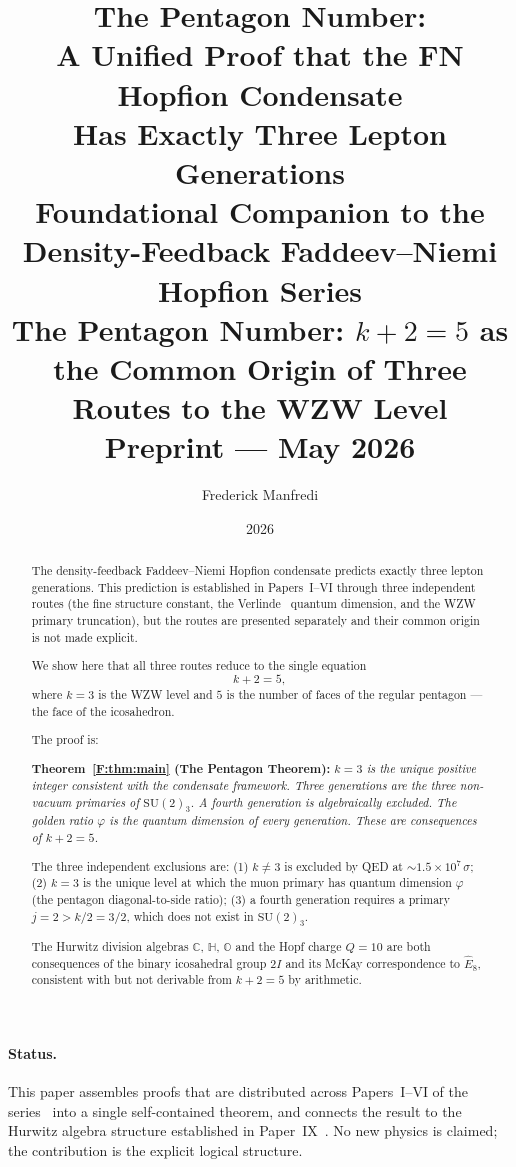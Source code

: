 \documentclass[11pt,a4paper]{article}
\title{\textbf{The Pentagon Number:\\
A Unified Proof that the FN Hopfion Condensate\\
Has Exactly Three Lepton Generations}
\\[0.6em]
{\large Foundational Companion to the Density-Feedback
Faddeev--Niemi Hopfion Series \\
The Pentagon Number: $k+2=5$ as the Common Origin
of Three Routes to the WZW Level}
\\[0.6em]
\large Preprint --- May 2026}
\author{Frederick Manfredi}
\date{2026}
\theoremstyle{definition}
\theoremstyle{remark}
\newcommand{\vp}{\varphi}
\newcommand{\CC}{\mathbb{C}}
\newcommand{\HH}{\mathbb{H}}
\newcommand{\OO}{\mathbb{O}}
\newcommand{\SUtwok}{\mathrm{SU}(2)_3}
\newcommand{\twoI}{2I}
\newcommand{\Ehat}{\hat{E}_8}
\begin{document}
\maketitle

\paragraph*{Status.}
This paper assembles proofs that are distributed across Papers~I--VI of the
series~\cite{Paper1,Paper2,Paper3,Paper4,Paper5,Paper6} into a single
self-contained theorem, and connects the result to the Hurwitz algebra
structure established in Paper~IX~\cite{Paper9}.
No new physics is claimed; the contribution is the explicit logical
structure.

\begin{abstract}
The density-feedback Faddeev--Niemi Hopfion condensate predicts exactly three
lepton generations.
This prediction is established in Papers~I--VI through three independent
routes (the fine structure constant, the Verlinde~\cite{Verlinde1988} quantum dimension, and the
WZW primary truncation), but the routes are presented separately and their
common origin is not made explicit.

We show here that all three routes reduce to the single equation
\begin{equation}
  k + 2 = 5,
  \label{F:eq:k_plus_2}
\end{equation}
where $k=3$ is the WZW level and $5$ is the number of faces of the regular
pentagon --- the face of the icosahedron.

The proof is:

\noindent\textbf{Theorem~\ref{F:thm:main} (The Pentagon Theorem):}
\textit{$k=3$ is the unique positive integer consistent with the condensate
framework.
Three generations are the three non-vacuum primaries of $\SUtwok$.
A fourth generation is algebraically excluded.
The golden ratio $\vp$ is the quantum dimension of every generation.
These are consequences of $k+2=5$.}

The three independent exclusions are:
(1) $k\neq3$ is excluded by QED at $\sim1.5\times10^7\,\sigma$;
(2) $k=3$ is the unique level at which the muon primary has quantum
    dimension $\vp$ (the pentagon diagonal-to-side ratio);
(3) a fourth generation requires a primary $j=2 > k/2 = 3/2$,
    which does not exist in $\SUtwok$.

The Hurwitz division algebras $\CC$, $\HH$, $\OO$ and the Hopf charge
$Q=10$ are both consequences of the binary icosahedral group $\twoI$ and
its McKay correspondence to $\Ehat$, consistent with but not derivable from
$k+2=5$ by arithmetic.


\end{abstract}
\end{document}
